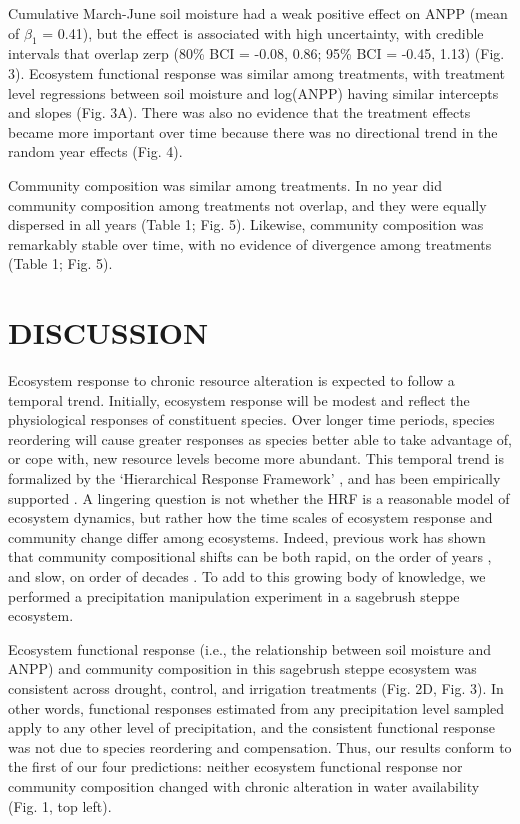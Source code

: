 \documentclass[fleqn,10pt,lineno]{wlpeerj} %
\begin{document}
Cumulative March-June soil moisture had a weak positive effect on ANPP
(mean of \(\beta_{1}\) = 0.41), but the effect is associated with high
uncertainty, with credible intervals that overlap zerp (80\% BCI =
-0.08, 0.86; 95\% BCI = -0.45, 1.13) (Fig. 3). Ecosystem functional
response was similar among treatments, with treatment level regressions
between soil moisture and log(ANPP) having similar intercepts and slopes
(Fig. 3A). There was also no evidence that the treatment effects became
more important over time because there was no directional trend in the
random year effects (Fig. 4).

Community composition was similar among treatments. In no year did
community composition among treatments not overlap, and they were
equally dispersed in all years (Table 1; Fig. 5). Likewise, community
composition was remarkably stable over time, with no evidence of
divergence among treatments (Table 1; Fig. 5).

\section{DISCUSSION}\label{discussion}

Ecosystem response to chronic resource alteration is expected to follow
a temporal trend. Initially, ecosystem response will be modest and
reflect the physiological responses of constituent species. Over longer
time periods, species reordering will cause greater responses as species
better able to take advantage of, or cope with, new resource levels
become more abundant. This temporal trend is formalized by the
`Hierarchical Response Framework' \citep[HRF,][]{Smith2009}, and has
been empirically supported \citep{Knapp2012, Wilcox2016}. A lingering
question is not whether the HRF is a reasonable model of ecosystem
dynamics, but rather how the time scales of ecosystem response and
community change differ among ecosystems. Indeed, previous work has
shown that community compositional shifts can be both rapid, on the
order of years \citep{Hoover2014}, and slow, on order of decades
\citep{Knapp2012, Wilcox2016}. To add to this growing body of knowledge,
we performed a precipitation manipulation experiment in a sagebrush
steppe ecosystem.

Ecosystem functional response (i.e., the relationship between soil
moisture and ANPP) and community composition in this sagebrush steppe
ecosystem was consistent across drought, control, and irrigation
treatments (Fig. 2D, Fig. 3). In other words, functional responses
estimated from any precipitation level sampled apply to any other level
of precipitation, and the consistent functional response was not due to
species reordering and compensation. Thus, our results conform to the
first of our four predictions: neither ecosystem functional response nor
community composition changed with chronic alteration in water
availability (Fig. 1, top left).
\end{document}
